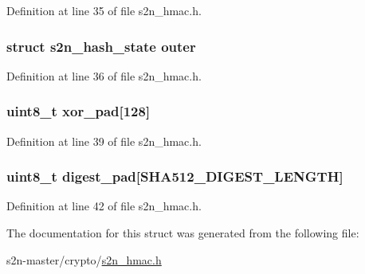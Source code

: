 Definition at line 35 of file s2n\+\_\+hmac.\+h.

\subsubsection[{\texorpdfstring{outer}{outer}}]{\setlength{\rightskip}{0pt plus 5cm}struct {\bf s2n\+\_\+hash\+\_\+state} outer}\hypertarget{structs2n__hmac__state_a7d8607ae48bf17ec01bd5b4cfb9ace66}{}\label{structs2n__hmac__state_a7d8607ae48bf17ec01bd5b4cfb9ace66}


Definition at line 36 of file s2n\+\_\+hmac.\+h.

\subsubsection[{\texorpdfstring{xor\+\_\+pad}{xor_pad}}]{\setlength{\rightskip}{0pt plus 5cm}uint8\+\_\+t xor\+\_\+pad\mbox{[}128\mbox{]}}\hypertarget{structs2n__hmac__state_a2f89765d4eb1f17131d29980f2a2c9d5}{}\label{structs2n__hmac__state_a2f89765d4eb1f17131d29980f2a2c9d5}


Definition at line 39 of file s2n\+\_\+hmac.\+h.

\subsubsection[{\texorpdfstring{digest\+\_\+pad}{digest_pad}}]{\setlength{\rightskip}{0pt plus 5cm}uint8\+\_\+t digest\+\_\+pad\mbox{[}{\bf S\+H\+A512\+\_\+\+D\+I\+G\+E\+S\+T\+\_\+\+L\+E\+N\+G\+TH}\mbox{]}}\hypertarget{structs2n__hmac__state_a5307db56761519da1750d395331d8e90}{}\label{structs2n__hmac__state_a5307db56761519da1750d395331d8e90}


Definition at line 42 of file s2n\+\_\+hmac.\+h.



The documentation for this struct was generated from the following file\+:\begin{DoxyCompactItemize}
\item 
s2n-\/master/crypto/\hyperlink{s2n__hmac_8h}{s2n\+\_\+hmac.\+h}\end{DoxyCompactItemize}
